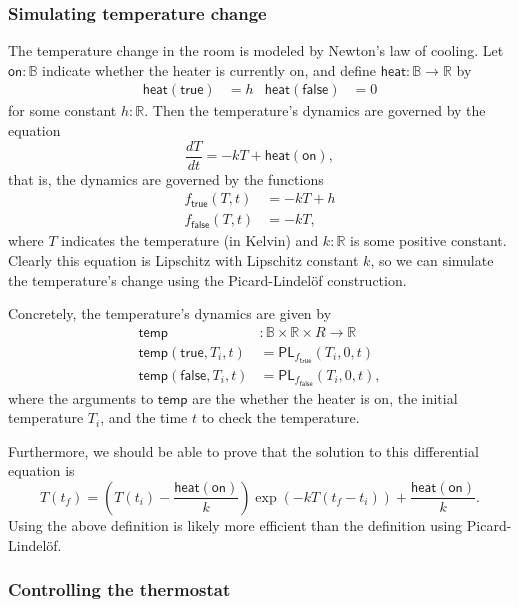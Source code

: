 \documentclass{article}           %
\newcommand{\R}{\mathbb{R}}
\newcommand{\bool}{\mathbb{B}}
\begin{document}
\subsubsection{Simulating temperature change}

The temperature change in the room is modeled by Newton's law of cooling. Let $\mathsf{on} : \bool$ indicate whether the heater is currently on, and define $\mathsf{heat} : \bool \to \R$ by
\begin{align*}
\mathsf{heat}(\mathsf{true}) &= h
&
\mathsf{heat}(\mathsf{false}) &= 0
\end{align*}
for some constant $h : \R$. Then the temperature's dynamics are governed by the equation
\[
\frac{dT}{dt} = -kT + \mathsf{heat}(\mathsf{on}),
\]
that is, the dynamics are governed by the functions
\begin{align*}
f_\mathsf{true}(T, t) &= -kT + h
\\ f_\mathsf{false}(T, t) &= -kT,
\end{align*}
where $T$ indicates the temperature (in Kelvin) and $k : \R$ is some positive constant. Clearly this equation is Lipschitz with Lipschitz constant $k$, so we can simulate the temperature's change using the Picard-Lindelöf construction.

Concretely, the temperature's dynamics are given by
\begin{align*}
\mathsf{temp} &: \bool \times \R \times R \to \R
\\ \mathsf{temp}(\mathsf{true}, T_i, t) &= \mathsf{PL}_{f_\mathsf{true}}(T_i, 0, t)
\\ \mathsf{temp}(\mathsf{false}, T_i, t) &= \mathsf{PL}_{f_\mathsf{false}}(T_i, 0, t),
\end{align*}
where the arguments to $\mathsf{temp}$ are the whether the heater is on, the initial temperature $T_i$, and the time $t$ to check the temperature.

Furthermore, we should be able to prove that the solution to this differential equation is
\[
T(t_f) = \left( T(t_i) - \frac{\mathsf{heat}(\mathsf{on})}{k}\right) \exp\left(-kT(t_f - t_i) \right) + \frac{\mathsf{heat}(\mathsf{on})}{k}.
\]
Using the above definition is likely more efficient than the definition using Picard-Lindelöf.

\subsubsection{Controlling the thermostat}
\end{document}
